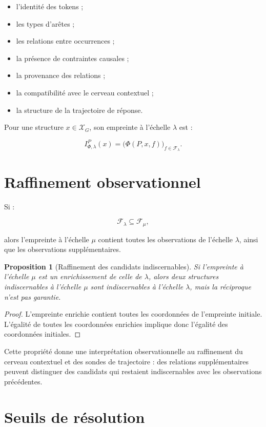 \documentclass[11pt,a4paper,oneside]{book}
\newtheorem{proposition}[definition]{Proposition}
\theoremstyle{remark}
\begin{document}
\begin{itemize}
  \item l'identité des tokens ;
  \item les types d'arêtes ;
  \item les relations entre occurrences ;
  \item la présence de contraintes causales ;
  \item la provenance des relations ;
  \item la compatibilité avec le cerveau contextuel ;
  \item la structure de la trajectoire de réponse.
\end{itemize}

Pour une structure \(x\in\mathcal{X}_G\), son empreinte à l'échelle
\(\lambda\) est :

\[
I_{\Phi,\lambda}^{P}(x)
=
\bigl(
\Phi(P,x,f)
\bigr)_{f\in\mathcal{F}_\lambda}.
\]

\section{Raffinement observationnel}

Si :

\[
\mathcal{F}_{\lambda}
\subseteq
\mathcal{F}_{\mu},
\]

alors l'empreinte à l'échelle \(\mu\) contient toutes les
observations de l'échelle \(\lambda\), ainsi que les observations
supplémentaires.

\begin{proposition}[Raffinement des candidats indiscernables]
Si l'empreinte à l'échelle \(\mu\) est un enrichissement de celle
de \(\lambda\), alors deux structures indiscernables à l'échelle
\(\mu\) sont indiscernables à l'échelle \(\lambda\), mais la
réciproque n'est pas garantie.
\end{proposition}

\begin{proof}
L'empreinte enrichie contient toutes les coordonnées de l'empreinte
initiale. L'égalité de toutes les coordonnées enrichies implique
donc l'égalité des coordonnées initiales.
\end{proof}

Cette propriété donne une interprétation observationnelle au
raffinement du cerveau contextuel et des sondes de trajectoire :
des relations supplémentaires peuvent distinguer des candidats
qui restaient indiscernables avec les observations précédentes.

\section{Seuils de résolution}
\end{document}
